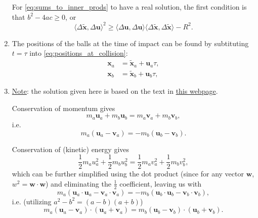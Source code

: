 \documentclass{article}
\renewcommand{\vec}[1]{\bm{#1}}
\newcommand{\iprod}[2]{\langle #1, #2 \rangle}
\begin{document}
\begin{enumerate}
        For \autoref{eq:sums_to_inner_prods} to have a real solution, the first condition is that $b^{2}-4ac\geq0$, or
        \begin{equation}
            \iprod{\Delta\tilde{\vec{x}}}{\Delta{\vec{u}}}^{2} \geq \iprod{\Delta{\vec{u}}}{\Delta{\vec{u}}}\iprod{\Delta\tilde{\vec{x}}}{\Delta\tilde{\vec{x}}} - R^{2}.
            \label{eq:test}
        \end{equation}

    \item The positions of the balls at the time of impact can be found by subtituting $t=\tau$ into \autoref{eq:positions_at_collision}:
        \begin{align}
            \vec{x}_{a} &= \tilde{\vec{x}}_{a} + \vec{u}_{a}\tau,\nonumber\\
            \vec{x}_{b} &= \tilde{\vec{x}}_{b} + \vec{u}_{b}\tau,
            \label{eq:positions_at_collision_2}
        \end{align}

    \item \underline{Note}: the solution given here is based on the text in \href{https://www.sjsu.edu/faculty/watkins/collision.htm}{this webpage}.

        \vspace{1em}
        Conservation of momentum gives
        \begin{equation}
            m_{a}\vec{u}_{a} + m_{b}\vec{u}_{b} = m_{a}\vec{v}_{a} + m_{b}\vec{v}_{b},
            \label{eq:conservation_of_momentum_1}
        \end{equation}
        i.e.
        \begin{equation}
            m_{a}\left(\vec{u}_{a}-\vec{v}_{a}\right) = -m_{b}\left(\vec{u}_{b}-\vec{v}_{b}\right).
                            \label{eq:conservation_of_momentum_2}
        \end{equation}

        Conservation of (kinetic) energy gives
        \begin{equation}
            \frac{1}{2}m_{a}u_{a}^{2} + \frac{1}{2}m_{b}u_{b}^{2} = \frac{1}{2}m_{a}v_{a}^{2} + \frac{1}{2}m_{b}v_{b}^{2},
            \label{eq:conservation_of_energy_1}
        \end{equation}
        which can be further simplified using the dot product (since for any vector $\vec{w}$, $w^{2}=\vec{w}\cdot\vec{w}$) and eliminating the $\frac{1}{2}$ coefficient, leaving us with
        \begin{equation}
            m_{a}\left( \vec{u}_{a}\cdot\vec{u}_{a} - \vec{v}_{a}\cdot\vec{v}_{a} \right) = -m_{b}\left( \vec{u}_{b}\cdot\vec{u}_{b} - \vec{v}_{b}\cdot\vec{v}_{b} \right),
            \label{eq:conservation_of_energy_2}
        \end{equation}
        i.e. (utilizing $a^{2}-b^{2}=(a-b)(a+b)$)
        \begin{equation}
            m_{a}\left( \vec{u}_{a}-\vec{v}_{a} \right)\cdot\left( \vec{u}_{a}+\vec{v}_{a} \right) = m_{b}\left( \vec{u}_{b}-\vec{v}_{b} \right)\cdot\left( \vec{u}_{b}+\vec{v}_{b} \right).
            \label{eq:conservation_of_energy_3}
        \end{equation}


\end{enumerate}
\end{document}
